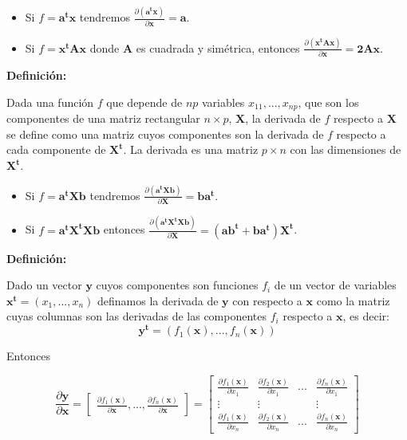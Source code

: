 \documentclass[12pt,letterpaper]{report} %
\begin{document}
\begin{itemize}
\item Si $f=\mathbf{a^tx}$ tendremos $\frac{\partial(\mathbf{a^tx})}{\partial \mathbf{x}}=\mathbf{a}$.
\item Si $f=\mathbf{x^tAx}$ donde $\mathbf{A}$ es cuadrada y simétrica, entonces $\frac{\partial(\mathbf{x^tAx})}{\partial \mathbf{x}}=\mathbf{2Ax}$.
\end{itemize}

\textbf{Definición:}

Dada una función $f$ que depende de $np$ variables $x_{11},...,x_{np}$, que son los componentes de una matriz rectangular $n\times p$, $\mathbf{X}$, la derivada de $f$ respecto a $\mathbf{X}$ se define como una matriz cuyos componentes son la derivada de $f$ respecto a cada componente de $\mathbf{X^t}$. La derivada es una matriz $p\times n$ con las dimensiones de $\mathbf{X^t}$.

\begin{itemize}
\item  Si $f=\mathbf{a^tXb}$ tendremos $\frac{\partial (\mathbf{a^tXb})}{\partial \mathbf{X}}=\mathbf{ba^t}$.
\item  Si $f=\mathbf{a^tX^tXb}$ entonces $\frac{\partial (\mathbf{a^tX^tXb})}{\partial \mathbf{X}}=(\mathbf{ab^t}+\mathbf{ba^t})\mathbf{X^t}$.
\end{itemize}

\textbf{Definición:}

Dado un vector $\mathbf{y}$ cuyos componentes son funciones $f_i$ de un vector de variables $\mathbf{x^t}=(x_1,...,x_n)$ definamos la derivada de $\mathbf{y}$ con respecto a $\mathbf{x}$ como la matriz cuyas columnas son las derivadas de las componentes $f_i$ respecto a $\mathbf{x}$, es decir:
$$\mathbf{y^t}=(f_1(\mathbf{x}),...,f_n(\mathbf{x}))$$

Entonces

$$\frac{\partial \mathbf{y}}{\partial \mathbf{x}}=\begin{bmatrix} \frac{\partial f_1(\mathbf{x})}{\partial \mathbf{x}},...,\frac{\partial f_n(\mathbf{x})}{\partial \mathbf{x}}\end{bmatrix}= 
\begin{bmatrix}
\frac{\partial f_1(\mathbf{x})}{\partial x_1} & \frac{\partial f_2(\mathbf{x})}{\partial x_1} & ... & \frac{\partial f_n(\mathbf{x})}{\partial x_1} \\
\vdots   & \vdots &   & \vdots \\
\frac{\partial f_1(\mathbf{x})}{\partial x_n} & \frac{\partial f_2(\mathbf{x})}{\partial x_n} & ... & \frac{\partial f_n(\mathbf{x})}{\partial x_n} 
\end{bmatrix} $$
\end{document}
